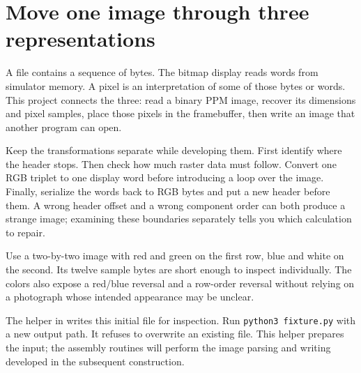 \section{Move one image through three representations}
A file contains a sequence of bytes. The bitmap display reads words from simulator
memory. A pixel is an interpretation of some of those bytes or words. This project
connects the three: read a binary PPM image, recover its dimensions and pixel samples,
place those pixels in the framebuffer, then write an image that another program can open.

Keep the transformations separate while developing them. First identify where the
header stops. Then check how much raster data must follow. Convert one RGB triplet to
one display word before introducing a loop over the image. Finally, serialize the
words back to RGB bytes and put a new header before them. A wrong header offset and a
wrong component order can both produce a strange image; examining these boundaries
separately tells you which calculation to repair.

Use a two-by-two image with red and green on the first row, blue and white on the
second. Its twelve sample bytes are short enough to inspect individually. The colors
also expose a red/blue reversal and a row-order reversal without relying on a photograph
whose intended appearance may be unclear.

The helper in  writes this initial file for inspection. Run
\texttt{python3 fixture.py} with a new output path. It refuses to overwrite an existing
file. This helper prepares the input; the assembly routines will perform the image
parsing and writing developed in the subsequent construction.
